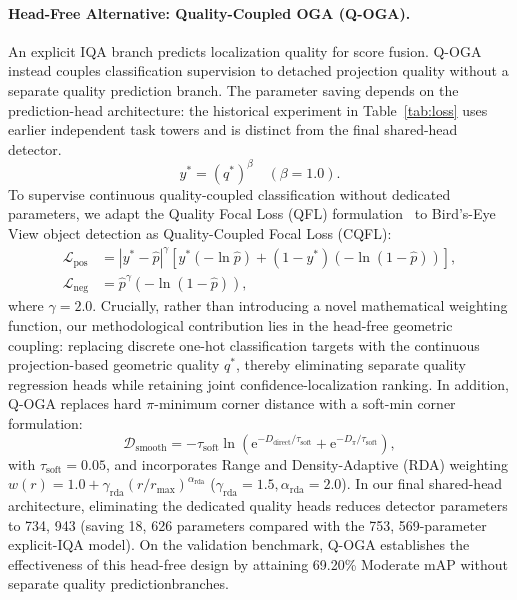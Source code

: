 \paragraph{Head-Free Alternative: \textbf{Quality-Coupled OGA} (Q-OGA).}
An explicit IQA branch predicts localization quality for score fusion. Q-OGA instead couples classification supervision to detached projection quality without a separate quality prediction branch. The parameter saving depends on the prediction-head architecture: the historical experiment in Table~\ref{tab:loss} uses earlier independent task towers and is distinct from the final shared-head detector.
\begin{equation}
    y^* = (q^*)^\beta \quad (\beta = 1.0).
    \label{eq:cqfl_target}
\end{equation}
To supervise continuous quality-coupled classification without dedicated parameters, we adapt the Quality Focal Loss (QFL) formulation~\cite{li2020gfl} to Bird's-Eye View object detection as Quality-Coupled Focal Loss (CQFL):
\begin{align}
    \mathcal{L}_{\mathrm{pos}} &= |y^* - \hat{p}|^\gamma \left[ y^* (-\ln \hat{p}) + (1 - y^*) (-\ln(1 - \hat{p})) \right], \nonumber\\
    \mathcal{L}_{\mathrm{neg}} &= \hat{p}^\gamma (-\ln(1 - \hat{p})),
    \label{eq:cqfl_loss}
\end{align}
where $\gamma = 2.0$. Crucially, rather than introducing a novel mathematical weighting function, our methodological contribution lies in the head-free geometric coupling: replacing discrete one-hot classification targets with the continuous projection-based geometric quality $q^*$, thereby eliminating separate quality regression heads while retaining joint confidence-localization ranking. In addition, Q-OGA replaces hard $\pi$-minimum corner distance with a soft-min corner formulation:
\begin{equation}
    \mathcal{D}_{\mathrm{smooth}} = -\tau_{\mathrm{soft}} \ln\left( \mathrm{e}^{-D_{\mathrm{direct}}/\tau_{\mathrm{soft}}} + \mathrm{e}^{-D_\pi/\tau_{\mathrm{soft}}} \right),
    \label{eq:softmin_corner}
\end{equation}
with $\tau_{\mathrm{soft}} = 0.05$, and incorporates Range and Density-Adaptive (RDA) weighting $w(r) = 1.0 + \gamma_{\mathrm{rda}}(r / r_{\max})^{\alpha_{\mathrm{rda}}}$ ($\gamma_{\mathrm{rda}} = 1.5, \alpha_{\mathrm{rda}} = 2.0$). In our final shared-head architecture, eliminating the dedicated quality heads reduces detector parameters to 734, 943 (saving 18, 626 parameters compared with the 753, 569-parameter explicit-IQA model). On the validation benchmark, Q-OGA establishes the effectiveness of this head-free design by attaining 69.20\% Moderate mAP without separate quality predictionbranches.


